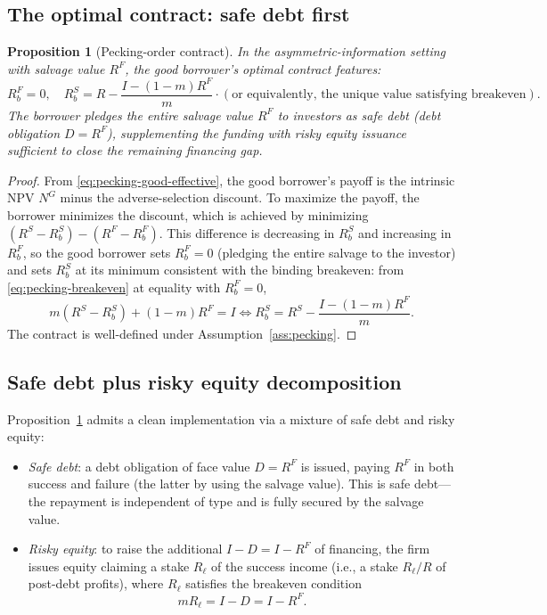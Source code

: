 \documentclass[11pt,a4paper,oneside]{book}
\theoremstyle{plain}
\newtheorem{proposition}[theorem]{Proposition}
\theoremstyle{definition}
\theoremstyle{remark}
\numberwithin{equation}{chapter}
\begin{document}
\subsection{The optimal contract: safe debt first}

\begin{proposition}[Pecking-order contract]\label{prop:pecking-order}
In the asymmetric-information setting with salvage value $R^F$, the good borrower's optimal contract features:
\begin{equation}\label{eq:pecking-order-contract}
  R_b^F = 0,
  \quad
  R_b^S = R - \frac{I - (1 - m) R^F}{m} \cdot (\text{or equivalently, the unique value satisfying breakeven}).
\end{equation}
The borrower pledges the entire salvage value $R^F$ to investors as safe debt (debt obligation $D = R^F$), supplementing the funding with risky equity issuance sufficient to close the remaining financing gap.
\end{proposition}

\begin{proof}
From \eqref{eq:pecking-good-effective}, the good borrower's payoff is the intrinsic NPV $N^G$ minus the adverse-selection discount.
To maximize the payoff, the borrower minimizes the discount, which is achieved by minimizing $(R^S - R_b^S) - (R^F - R_b^F)$.
This difference is decreasing in $R_b^S$ and increasing in $R_b^F$, so the good borrower sets $R_b^F = 0$ (pledging the entire salvage to the investor) and sets $R_b^S$ at its minimum consistent with the binding breakeven: from \eqref{eq:pecking-breakeven} at equality with $R_b^F = 0$,
\begin{equation*}
  m(R^S - R_b^S) + (1 - m) R^F = I
  \Longleftrightarrow
  R_b^S = R^S - \frac{I - (1 - m) R^F}{m}.
\end{equation*}
The contract is well-defined under Assumption~\ref{ass:pecking}.
\end{proof}

\subsection{Safe debt plus risky equity decomposition}

Proposition~\ref{prop:pecking-order} admits a clean implementation via a mixture of safe debt and risky equity:

\begin{itemize}
  \item \emph{Safe debt}: a debt obligation of face value $D = R^F$ is issued, paying $R^F$ in both success and failure (the latter by using the salvage value).
  This is safe debt---the repayment is independent of type and is fully secured by the salvage value.
  \item \emph{Risky equity}: to raise the additional $I - D = I - R^F$ of financing, the firm issues equity claiming a stake $R_\ell$ of the success income (i.e., a stake $R_\ell/R$ of post-debt profits), where $R_\ell$ satisfies the breakeven condition
  \begin{equation*}
    m R_\ell = I - D = I - R^F.
  \end{equation*}
\end{itemize}
\end{document}
